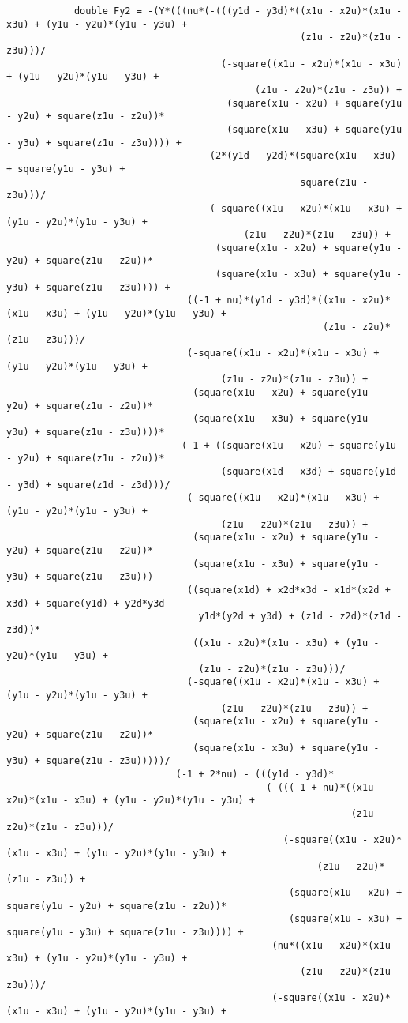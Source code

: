\begin{lstlisting}
			double Fy2 = -(Y*(((nu*(-(((y1d - y3d)*((x1u - x2u)*(x1u - x3u) + (y1u - y2u)*(y1u - y3u) + 
													(z1u - z2u)*(z1u - z3u)))/
									  (-square((x1u - x2u)*(x1u - x3u) + (y1u - y2u)*(y1u - y3u) + 
											(z1u - z2u)*(z1u - z3u)) + 
									   (square(x1u - x2u) + square(y1u - y2u) + square(z1u - z2u))*
									   (square(x1u - x3u) + square(y1u - y3u) + square(z1u - z3u)))) + 
									(2*(y1d - y2d)*(square(x1u - x3u) + square(y1u - y3u) + 
													square(z1u - z3u)))/
									(-square((x1u - x2u)*(x1u - x3u) + (y1u - y2u)*(y1u - y3u) + 
										  (z1u - z2u)*(z1u - z3u)) + 
									 (square(x1u - x2u) + square(y1u - y2u) + square(z1u - z2u))*
									 (square(x1u - x3u) + square(y1u - y3u) + square(z1u - z3u)))) + 
								((-1 + nu)*(y1d - y3d)*((x1u - x2u)*(x1u - x3u) + (y1u - y2u)*(y1u - y3u) + 
														(z1u - z2u)*(z1u - z3u)))/
								(-square((x1u - x2u)*(x1u - x3u) + (y1u - y2u)*(y1u - y3u) + 
									  (z1u - z2u)*(z1u - z3u)) + 
								 (square(x1u - x2u) + square(y1u - y2u) + square(z1u - z2u))*
								 (square(x1u - x3u) + square(y1u - y3u) + square(z1u - z3u))))*
							   (-1 + ((square(x1u - x2u) + square(y1u - y2u) + square(z1u - z2u))*
									  (square(x1d - x3d) + square(y1d - y3d) + square(z1d - z3d)))/
								(-square((x1u - x2u)*(x1u - x3u) + (y1u - y2u)*(y1u - y3u) + 
									  (z1u - z2u)*(z1u - z3u)) + 
								 (square(x1u - x2u) + square(y1u - y2u) + square(z1u - z2u))*
								 (square(x1u - x3u) + square(y1u - y3u) + square(z1u - z3u))) - 
								((square(x1d) + x2d*x3d - x1d*(x2d + x3d) + square(y1d) + y2d*y3d - 
								  y1d*(y2d + y3d) + (z1d - z2d)*(z1d - z3d))*
								 ((x1u - x2u)*(x1u - x3u) + (y1u - y2u)*(y1u - y3u) + 
								  (z1u - z2u)*(z1u - z3u)))/
								(-square((x1u - x2u)*(x1u - x3u) + (y1u - y2u)*(y1u - y3u) + 
									  (z1u - z2u)*(z1u - z3u)) + 
								 (square(x1u - x2u) + square(y1u - y2u) + square(z1u - z2u))*
								 (square(x1u - x3u) + square(y1u - y3u) + square(z1u - z3u)))))/
							  (-1 + 2*nu) - (((y1d - y3d)*
											  (-(((-1 + nu)*((x1u - x2u)*(x1u - x3u) + (y1u - y2u)*(y1u - y3u) + 
															 (z1u - z2u)*(z1u - z3u)))/
												 (-square((x1u - x2u)*(x1u - x3u) + (y1u - y2u)*(y1u - y3u) + 
													   (z1u - z2u)*(z1u - z3u)) + 
												  (square(x1u - x2u) + square(y1u - y2u) + square(z1u - z2u))*
												  (square(x1u - x3u) + square(y1u - y3u) + square(z1u - z3u)))) + 
											   (nu*((x1u - x2u)*(x1u - x3u) + (y1u - y2u)*(y1u - y3u) + 
													(z1u - z2u)*(z1u - z3u)))/
											   (-square((x1u - x2u)*(x1u - x3u) + (y1u - y2u)*(y1u - y3u) + 

\end{lstlisting}
